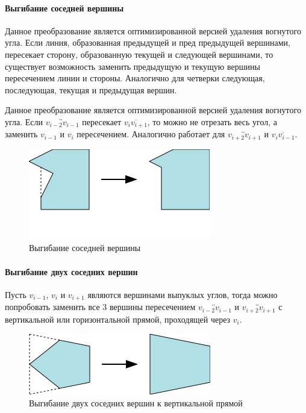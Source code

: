 \documentclass{fefu_thesis/cls/fefu}
\newcommand*\gsegment[1]{\overline{#1}}
\newcommand*\gline[1]{\overleftrightarrow{#1}}
\begin{document}
    \paragraph{Выгибание соседней вершины}
    Данное преобразование является оптимизированной версией удаления вогнутого угла. Если линия, образованная предыдущей и пред предыдущей вершинами, пересекает сторону, образованную текущей и следующей вершинами, то существует возможность заменить предыдущую и текущую вершины пересечением линии и стороны. Аналогично для четверки следующая, последующая, текущая и предыдущая вершин.

    Данное преобразование является оптимизированной версией удаления вогнутого угла. Если $\gline{v_{i - 2}v_{i - 1}}$ пересекает $\gsegment{v_iv_{i + 1}}$, то можно не отрезать весь угол, а заменить $v_{i - 1}$ и $v_{i}$ пересечением. Аналогично работает для $\gline{v_{i + 2}v_{i + 1}}$ и $\gsegment{v_iv_{i - 1}}$.

    \begin{figure}[H]
        \centering
        \includegraphics[scale=1]{images/bendneighbor.png}
        \caption{Выгибание соседней вершины}
    \end{figure}

    \paragraph{Выгибание двух соседних вершин}
    Пусть $v_{i - 1}$, $v_{i}$ и $v_{i + 1}$ являются вершинами выпуклых углов, тогда можно попробовать заменить все 3 вершины пересечением $\gline{v_{i - 2}v_{i - 1}}$ и $\gline{v_{i + 2}v_{i + 1}}$ с вертикальной или горизонтальной прямой, проходящей через $v_i$.
    \begin{figure}[H]
        \centering
        \includegraphics[scale=1]{images/bendoutboth.png}
        \caption{Выгибание двух соседних вершин к вертикальной прямой}
    \end{figure}
\end{document}
